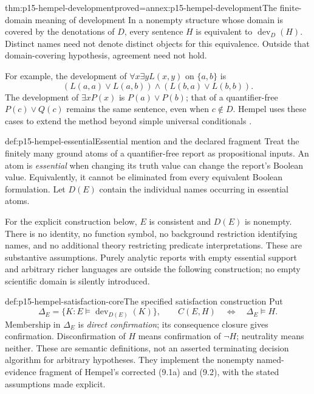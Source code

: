 \begin{hblemma}{thm:p15-hempel-development}{proved=annex:p15-hempel-development}{The finite-domain meaning of development}
In a nonempty structure whose domain is covered by the denotations of $D$,
every sentence $H$ is equivalent to $\operatorname{dev}_D(H)$.
Distinct names need not denote distinct objects for this equivalence.
Outside that domain-covering hypothesis, agreement need not hold.
\end{hblemma}

For example, the development of $\forall x\exists y L(x,y)$ on $\{a,b\}$ is
\[
 (L(a,a)\lor L(a,b))\land(L(b,a)\lor L(b,b)).
\]
The development of $\exists xP(x)$ is $P(a)\lor P(b)$; that of a
quantifier-free $P(c)\lor Q(c)$ remains the same sentence, even when
$c\notin D$. Hempel uses these cases to extend the method beyond simple
universal conditionals
\parencite[II, \S9, pp.~108--110]{Hempel1945ConfirmationII}.

\begin{hbdefinition}{def:p15-hempel-essential}{Essential mention and the declared fragment}
Treat the finitely many ground atoms of a quantifier-free report as
propositional inputs. An atom is \emph{essential} when changing its truth
value can change the report's Boolean value. Equivalently, it cannot be
eliminated from every equivalent Boolean formulation. Let $D(E)$ contain
the individual names occurring in essential atoms.

For the explicit construction below, $E$ is consistent and $D(E)$ is
nonempty. There is no identity, no function symbol, no background
restriction identifying names, and no additional theory restricting
predicate interpretations. These are substantive assumptions.
Purely analytic reports with empty essential support and arbitrary richer
languages are outside the following construction; no empty scientific
domain is silently introduced.
\end{hbdefinition}

\begin{hbdefinition}{def:p15-hempel-satisfaction-core}{The specified satisfaction construction}
Put
\[
 \Delta_E=\{K:E\models\operatorname{dev}_{D(E)}(K)\},\qquad
 C(E,H)\quad\Longleftrightarrow\quad\Delta_E\models H.
\]
Membership in $\Delta_E$ is \emph{direct confirmation}; its consequence
closure gives confirmation. Disconfirmation of $H$ means confirmation
of $\neg H$; neutrality means neither. These are semantic definitions,
not an asserted terminating decision algorithm for arbitrary hypotheses.
They implement the nonempty named-evidence fragment of Hempel's corrected
(9.1a) and (9.2), with the stated assumptions made explicit.
\end{hbdefinition}

